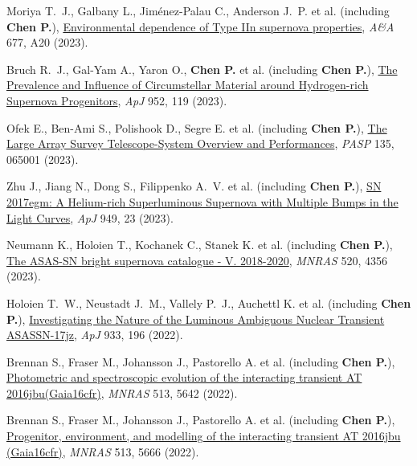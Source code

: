 \item Moriya T.~J., Galbany L., Jim{\'e}nez-Palau C., Anderson J.~P. et al. (including \textbf{Chen P.}), \href{https://ui.adsabs.harvard.edu/abs/2023A&A...677A..20M}{Environmental dependence of Type IIn supernova properties}, \textit{A\&A} 677, A20 (2023).

\item Bruch R.~J., Gal-Yam A., Yaron O., \textbf{Chen P.} et al. (including \textbf{Chen P.}), \href{https://ui.adsabs.harvard.edu/abs/2023ApJ...952..119B}{The Prevalence and Influence of Circumstellar Material around Hydrogen-rich Supernova Progenitors}, \textit{ApJ} 952, 119 (2023).

\item Ofek E., Ben-Ami S., Polishook D., Segre E. et al. (including \textbf{Chen P.}), \href{https://ui.adsabs.harvard.edu/abs/2023PASP..135f5001O}{The Large Array Survey Telescope-System Overview and Performances}, \textit{PASP} 135, 065001 (2023).

\item Zhu J., Jiang N., Dong S., Filippenko A.~V. et al. (including \textbf{Chen P.}), \href{https://ui.adsabs.harvard.edu/abs/2023ApJ...949...23Z}{SN 2017egm: A Helium-rich Superluminous Supernova with Multiple Bumps in the Light Curves}, \textit{ApJ} 949, 23 (2023).

\item Neumann K., Holoien T., Kochanek C., Stanek K. et al. (including \textbf{Chen P.}), \href{https://ui.adsabs.harvard.edu/abs/2023MNRAS.520.4356N}{The ASAS-SN bright supernova catalogue - V. 2018-2020}, \textit{MNRAS} 520, 4356 (2023).

\item Holoien T.~W., Neustadt J.~M., Vallely P.~J., Auchettl K. et al. (including \textbf{Chen P.}), \href{https://ui.adsabs.harvard.edu/abs/2022ApJ...933..196H}{Investigating the Nature of the Luminous Ambiguous Nuclear Transient ASASSN-17jz}, \textit{ApJ} 933, 196 (2022).

\item Brennan S., Fraser M., Johansson J., Pastorello A. et al. (including \textbf{Chen P.}), \href{https://ui.adsabs.harvard.edu/abs/2022MNRAS.513.5642B}{Photometric and spectroscopic evolution of the interacting transient AT 2016jbu(Gaia16cfr)}, \textit{MNRAS} 513, 5642 (2022).

\item Brennan S., Fraser M., Johansson J., Pastorello A. et al. (including \textbf{Chen P.}), \href{https://ui.adsabs.harvard.edu/abs/2022MNRAS.513.5666B}{Progenitor, environment, and modelling of the interacting transient AT 2016jbu (Gaia16cfr)}, \textit{MNRAS} 513, 5666 (2022).

